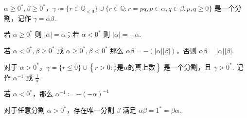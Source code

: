 \begin{proposition}
$\alpha\geq0^{*},\beta\geq0^{*}$，$\gamma\coloneqq \{ r\in \mathbb{Q}_{<0} \}\cup \{ r\in \mathbb{Q}:r=pq,p\in \alpha,q\in\beta,p,q\geq0 \}$ 是一个分割，记作 $\gamma=\alpha\beta$.
\end{proposition}
\begin{definition}[分割的绝对值]
若 $\alpha\geq0^{*}$ 则 $\lvert \alpha \rvert=\alpha$；若 $\alpha<0^{*}$ 则 $\lvert \alpha \rvert=-\alpha$.
\end{definition}
若 $\alpha<0^{*},\beta\geq0^{*}$ 或 $\alpha\geq0^{*},\beta<0^{*}$ 那么 $\alpha\beta=-(\lvert \alpha \rvert \lvert \beta \rvert)$，否则 $\alpha\beta=\lvert \alpha \rvert \lvert \beta \rvert$.

\begin{proposition}
对于 $\alpha>0^{*}$，$\gamma=\{ r\leq0 \}\cup \left\{  r>0:\frac{1}{r}\text{是}\alpha \text{的真上数} \right\}$ 是一个分割，且 $\gamma>0^{*}$. 记作 $\alpha ^{-1}$ 或 $\frac{1}{\alpha}$.
\end{proposition}
若 $\alpha<0^{*}$，那么 $\alpha ^{-1}\coloneqq-(-\alpha)^{-1}$

\begin{proposition}
对于任意分割 $\alpha>0^{*}$，存在唯一分割 $\beta$ 满足 $\alpha\beta=1^{*}=\beta\alpha$.
\end{proposition}
